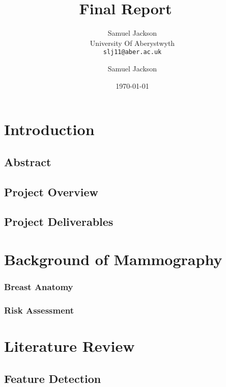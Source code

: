 \documentclass[paper=a4, fontsize=11pt]{scrartcl}	%
\title{
	\vspace{-0.5in} 	\usefont{OT1}{bch}{b}{n}
	 Final Report \
}
\author{
	\usefont{OT1}{bch}{m}{n} Samuel Jackson
	\\ \usefont{OT1}{bch}{m}{n} University Of Aberystwyth
	\\   \texttt{slj11@aber.ac.uk}
}
\author{Samuel Jackson}
\date{\today}
\numberwithin{equation}{section}															%
\numberwithin{figure}{section}																%
\numberwithin{table}{section}
\begin{document}
\maketitle
\newpage

\tableofcontents

\newpage

\section{Introduction}

\subsection{Abstract}

\subsection{Project Overview}

\subsection{Project Deliverables}

\section{Background of Mammography}

\subsubsection{Breast Anatomy}

\subsubsection{Risk Assessment}

\section{Literature Review}

\subsection{Feature Detection}
\end{document}
